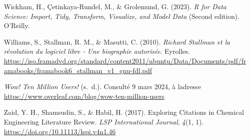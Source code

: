\documentclass[
  letterpaper,
  DIV=11,
  numbers=noendperiod]{scrreprt}
\newlength{\cslhangindent}
\newenvironment{CSLReferences}[2] %
 {\begin{list}{}{%
  \setlength{\itemindent}{0pt}
  \setlength{\leftmargin}{0pt}
  \setlength{\parsep}{0pt}
  \ifodd #1
   \setlength{\leftmargin}{\cslhangindent}
   \setlength{\itemindent}{-1\cslhangindent}
  \fi
  \setlength{\itemsep}{#2\baselineskip}}}
 {\end{list}}
\begin{document}
\begin{CSLReferences}{1}{0}
Wickham, H., Çetinkaya-Rundel, M., \& Grolemund, G. (2023). \emph{R for
Data Science: Import, Tidy, Transform, Visualize, and Model Data}
(Second edition). O'Reilly.

Williams, S., Stallman, R. M., \& Masutti, C. (2010). \emph{Richard
Stallman et la révolution du logiciel libre - Une biographie autorisée}.
Eyrolles.
\url{https://iso.framadvd.org/standard/content2011/ubuntu/Data/Documents/pdf/framabooks/framabook6_stallman_v1_gnu-fdl.pdf}

\emph{Wow! {Ten} Million Users!} (s.~d.). Consulté 9 mars 2024, à
l\textquotesingle adresse
\url{https://www.overleaf.com/blog/wow-ten-million-users}

Zaid, Y. H., Shamsudin, S., \& Habil, H. (2017). Exploring {Citations}
in {Chemical Engineering Literature Review}. \emph{LSP International
Journal}, \emph{4}(1, 1). \url{https://doi.org/10.11113/lspi.v4n1.46}

\end{CSLReferences}
\end{document}
